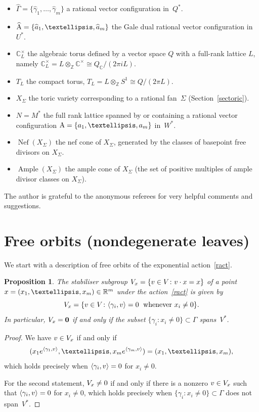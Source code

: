 \documentclass[a4paper]{amsart}
\newtheorem{proposition}[theorem]{Proposition}
\theoremstyle{definition}
\theoremstyle{remark}
\numberwithin{equation}{section}
\def\R{\mathbb R}
\def\C{\mathbb C}
\def\R{\mathbb R}
\def\Z{\mathbb Z}
\newcommand{\mb}[1]{{\textbf {\textit#1}}}
\newcommand{\<}{\langle}
\renewcommand{\>}{\rangle}
\begin{document}
\begin{itemize}
\item
$\widehat\Gamma=\{\widehat\gamma_1,\ldots,\widehat\gamma_m\}$ a rational vector configuration in~$Q^*$.

\item
$\widehat{\mathrm A}=\{\widehat{\mb a}_1,\ldots,\widehat{\mb a}_m\}$ the Gale dual rational vector configuration in~$U^*$.

\item
$\C^\times_L$ the algebraic torus defined by a vector space $Q$ with a full-rank lattice $L$, namely $\C^\times_L=L\otimes_\Z\C^\times\cong Q_\C/(2\pi i L)$.

\item
$T_L$ the compact torus, $T_L=L\otimes_\Z S^1 \cong Q/(2\pi L)$.

\item
$X_\Sigma$ the toric variety corresponding to a rational fan~$\Sigma$ (Section~\ref{sectoric}).

\item
$N=M^*$ the full rank lattice spanned by or containing a rational vector configuration $\mathrm A=\{\mb a_1,\ldots,\mb a_m\}$ in~$W^*$.

\item 
$\mathop\mathrm{Nef}(X_\Sigma)$ the nef cone of $X_\Sigma$, generated by the classes of basepoint free divisors on $X_\Sigma$.

\item 
$\mathop\mathrm{Ample}(X_\Sigma)$ the ample cone of $X_\Sigma$ (the set of positive multiples of ample divisor classes on $X_\Sigma$).
\end{itemize}

The author is grateful to the anonymous referees for very helpful comments and suggestions.


\section{Free orbits (nondegenerate leaves)}\label{secfree}
We start with a description of free orbits of the exponential action~\eqref{ract}.

\begin{proposition}\label{freeorbit}
The stabiliser subgroup $V_{\mb x}=\{\mb v\in V\colon \mb v\cdot\mb x=\mb x\}$
of a point $\mb x=(x_1,\ldots,x_m)\in\R^m$ under the action~\eqref{ract} is given by
\[
  V_{\mb x}=\{\mb v\in V\colon\langle\gamma_i,\mb v\rangle=0\;
  \text{ whenever }x_i\ne0\}.
\]
In particular, $V_{\mb x}=\bf0$ if and only if
the subset $\{\gamma_i\colon x_i\ne0\}\subset\Gamma$ spans~$V^*$.
\end{proposition}
\begin{proof}
We have $\mb v\in V_{\mb x}$ if and only if
\[
  (x_1e^{\langle\gamma_1,\mb
  v\rangle},\ldots,x_me^{\langle\gamma_m,\mb v\rangle})=(x_1,\ldots,x_m),
\]
which holds precisely when $\langle\gamma_i,\mb v\rangle=0$ for $x_i\ne0$.

For the second statement, $V_{\mb x}\ne0$ if and only if there is a nonzero $\mb v\in V_{\mb x}$ such that $\langle\gamma_i,\mb v\rangle=0$ for $x_i\ne0$, which holds precisely when $\{\gamma_i\colon x_i\ne0\}\subset\Gamma$ does not span~$V^*$.
\end{proof}
\end{document}
